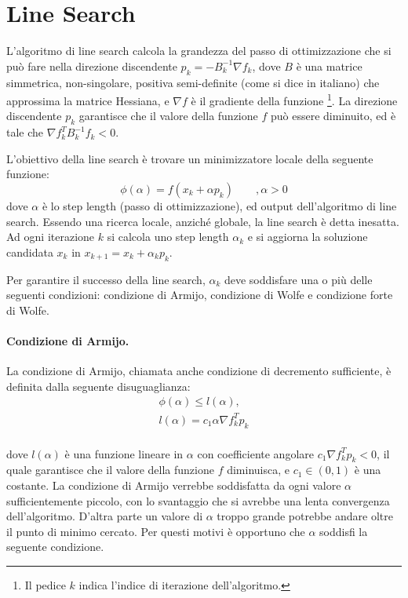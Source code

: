 \documentclass[10pt,a4paper]{article}
\author{Carlo Alessi}
\begin{document}
\section{Line Search}
L'algoritmo di line search calcola la grandezza del passo di ottimizzazione che si può fare nella direzione discendente $p_k=-B_k^{-1} \nabla f_k$, dove $B$ è una matrice simmetrica, non-singolare, positiva semi-definite (come si dice in italiano) che approssima la matrice Hessiana, e $\nabla f$ è il gradiente della funzione \footnote{Il pedice $k$ indica l'indice di iterazione dell'algoritmo.}. 
La direzione discendente $p_k$ garantisce che il valore della funzione $f$ può essere diminuito, ed è tale che $\nabla f_k^T B_k^{-1} f_k < 0$.

L'obiettivo della line search è trovare un minimizzatore locale della seguente funzione:
\[ \phi (\alpha) = f(x_k + \alpha p_k) \qquad, \alpha > 0 \] 
dove $\alpha$ è lo step length (passo di ottimizzazione), ed output dell'algoritmo di line search. Essendo una ricerca locale, anziché globale, la line search è detta inesatta. 
Ad ogni iterazione $k$ si calcola uno step length $\alpha_k$ e si aggiorna la soluzione candidata $x_k$ in $x_{k+1} = x_k + \alpha_k p_k$.

Per garantire il successo della line search, $\alpha_k$ deve soddisfare una o più delle seguenti condizioni: condizione di Armijo, condizione di Wolfe e condizione forte di Wolfe.

\paragraph{Condizione di Armijo.}
La condizione di Armijo, chiamata anche condizione di decremento sufficiente, è definita dalla seguente disuguaglianza:
\begin{equation}
\begin{aligned}
\phi(\alpha) \leq l(\alpha), \\
l(\alpha) = c_1 \alpha \nabla f_k^Tp_k \\
\end{aligned}
\end{equation}

dove $l(\alpha)$ è una funzione lineare in $\alpha$ con coefficiente angolare $c_1 \nabla f_k^Tp_k < 0$, il quale garantisce che il valore della funzione $f$ diminuisca, e $c_1 \in (0,1)$ è una costante. La condizione di Armijo verrebbe soddisfatta da ogni valore $\alpha$ sufficientemente piccolo, con lo svantaggio che si avrebbe una lenta convergenza dell'algoritmo. D'altra parte un valore di $\alpha$ troppo grande potrebbe andare oltre il punto di minimo cercato. Per questi motivi è opportuno che $\alpha$ soddisfi la seguente condizione.
\end{document}
